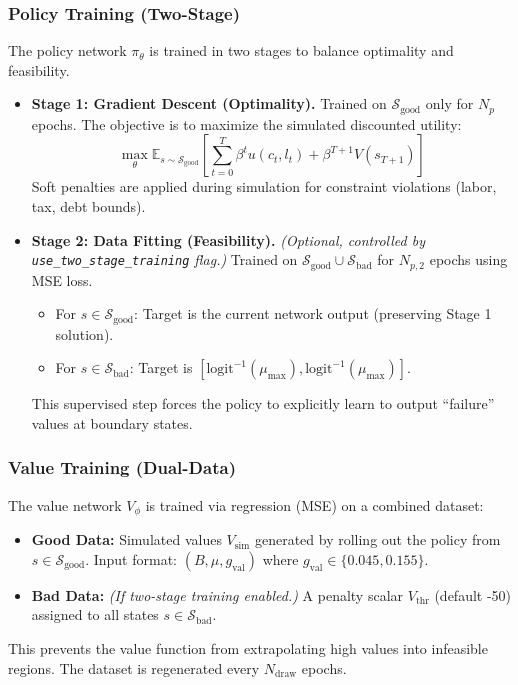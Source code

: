 \subsubsection{Policy Training (Two-Stage)}
The policy network $\pi_{\theta}$ is trained in two stages to balance optimality and feasibility.

\begin{itemize}
    \item \textbf{Stage 1: Gradient Descent (Optimality).} Trained on $\mathcal{S}_{\text{good}}$ only for $N_p$ epochs. The objective is to maximize the simulated discounted utility:
    \[ \max_{\theta} \mathbb{E}_{s \sim \mathcal{S}_{\text{good}}} \left[ \sum_{t=0}^{T} \beta^t u(c_t, l_t) + \beta^{T+1} V(s_{T+1}) \right] \]
    Soft penalties are applied during simulation for constraint violations (labor, tax, debt bounds).
    
    \item \textbf{Stage 2: Data Fitting (Feasibility).} \textit{(Optional, controlled by \texttt{use\_two\_stage\_training} flag.)} Trained on $\mathcal{S}_{\text{good}} \cup \mathcal{S}_{\text{bad}}$ for $N_{p,2}$ epochs using MSE loss.
    \begin{itemize}
        \item For $s \in \mathcal{S}_{\text{good}}$: Target is the current network output (preserving Stage 1 solution).
        \item For $s \in \mathcal{S}_{\text{bad}}$: Target is $[\text{logit}^{-1}(\mu_{\max}), \text{logit}^{-1}(\mu_{\max})]$.
    \end{itemize}
    This supervised step forces the policy to explicitly learn to output ``failure'' values at boundary states.
\end{itemize}

\subsubsection{Value Training (Dual-Data)}
The value network $V_{\phi}$ is trained via regression (MSE) on a combined dataset:
\begin{itemize}
    \item \textbf{Good Data:} Simulated values $V_{\text{sim}}$ generated by rolling out the policy from $s \in \mathcal{S}_{\text{good}}$. Input format: $(B, \mu, g_{\text{val}})$ where $g_{\text{val}} \in \{0.045, 0.155\}$.
    \item \textbf{Bad Data:} \textit{(If two-stage training enabled.)} A penalty scalar $V_{\text{thr}}$ (default -50) assigned to all states $s \in \mathcal{S}_{\text{bad}}$.
\end{itemize}
This prevents the value function from extrapolating high values into infeasible regions. The dataset is regenerated every $N_{\text{draw}}$ epochs.


